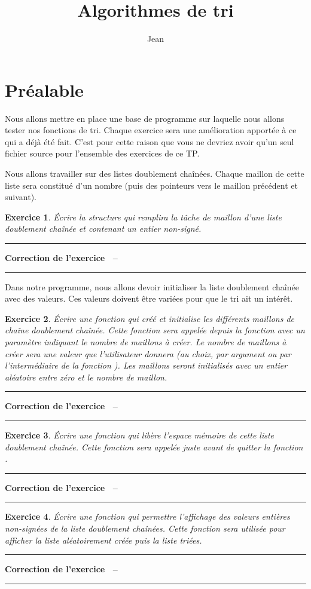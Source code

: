 \documentclass[a4paper]{article}
\title{Algorithmes de tri}
\author{Jean \Nom{Simard}}
\date{\Date[l]{04}{11}{2009}}
\newtheorem{Exo}{Exercice}
\newenvironment{Correction}{\par\tiny\blue\rule[1ex]{\textwidth}{1pt}\par\normalsize\textbf{Correction de l'exercice~\theExo{} -- }}{\par\tiny\blue\rule[1ex]{\textwidth}{1pt}\par}
\begin{document}
	\maketitle
	\section{Préalable}
		Nous allons mettre en place une base de programme sur laquelle nous allons tester nos fonctions de tri.
		Chaque exercice sera une amélioration apportée à ce qui a déjà été fait.
		C'est pour cette raison que vous ne devriez avoir qu'un seul fichier source pour l'ensemble des exercices de ce TP.

		Nous allons travailler sur des listes doublement chaînées.
		Chaque maillon de cette liste sera constitué d'un nombre (puis des pointeurs vers le maillon précédent et suivant).
		\begin{Exo}
			Écrire la structure qui remplira la tâche de maillon d'une liste doublement chaînée et contenant un entier non-signé.
		\end{Exo}
		\begin{Correction}
		\end{Correction}

		Dans notre programme, nous allons devoir initialiser la liste doublement chaînée avec des valeurs.
		Ces valeurs doivent être variées pour que le tri ait un intérêt.
		\begin{Exo}
			Écrire une fonction qui créé et initialise les différents maillons de chaîne doublement chaînée.
			Cette fonction sera appelée depuis la fonction  avec un paramètre indiquant le nombre de maillons à créer.
			Le nombre de maillons à créer sera une valeur que l'utilisateur donnera (au choix, par argument ou par l'intermédiaire de la fonction ).
			Les maillons seront initialisés avec un entier aléatoire entre zéro et le nombre de maillon.
		\end{Exo}
		\begin{Correction}
		\end{Correction}
		\begin{Exo}
			Écrire une fonction qui libère l'espace mémoire de cette liste doublement chaînée.
			Cette fonction sera appelée juste avant de quitter la fonction .
		\end{Exo}
		\begin{Correction}
		\end{Correction}
		\begin{Exo}
			Écrire une fonction qui permettre l'affichage des valeurs entières non-signées de la liste doublement chaînées.
			Cette fonction sera utilisée pour afficher la liste aléatoirement créée puis la liste triées.
		\end{Exo}
		\begin{Correction}
		\end{Correction}
		
\end{document}
